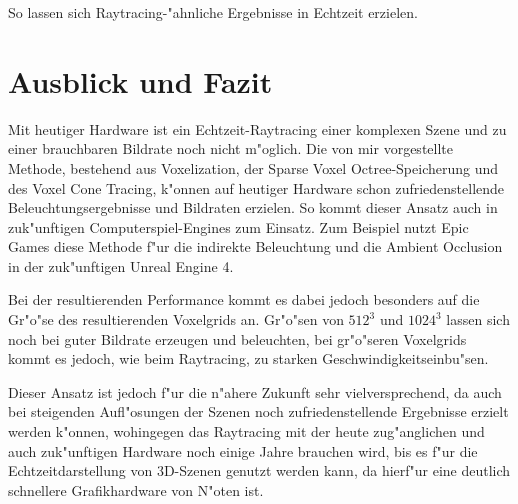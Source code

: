 \documentclass[a4paper, 12pt]{scrartcl}
\begin{document}
So lassen sich Raytracing-"ahnliche Ergebnisse in Echtzeit erzielen.


\section{Ausblick und Fazit}
Mit heutiger Hardware ist ein Echtzeit-Raytracing einer komplexen Szene und zu einer brauchbaren Bildrate noch nicht m"oglich. Die von mir vorgestellte Methode, bestehend aus Voxelization, der Sparse Voxel Octree-Speicherung und des Voxel Cone Tracing, k"onnen auf heutiger Hardware schon zufriedenstellende Beleuchtungsergebnisse und Bildraten erzielen. 
So kommt dieser Ansatz auch in zuk"unftigen Computerspiel-Engines zum Einsatz. Zum Beispiel nutzt Epic Games diese Methode f"ur die indirekte Beleuchtung und die Ambient Occlusion in der zuk"unftigen Unreal Engine 4. 

Bei der resultierenden Performance kommt es dabei jedoch besonders auf die Gr"o"se des resultierenden Voxelgrids an. Gr"o"sen von $512^3$ und $1024^3$ lassen sich noch bei guter Bildrate erzeugen und beleuchten, bei gr"o"seren Voxelgrids kommt es jedoch, wie beim Raytracing, zu starken Geschwindigkeitseinbu"sen.
 
 
Dieser Ansatz ist jedoch f"ur die n"ahere Zukunft sehr vielversprechend, da auch bei steigenden Aufl"osungen der Szenen noch zufriedenstellende Ergebnisse erzielt werden k"onnen, wohingegen das Raytracing mit der heute zug"anglichen und auch zuk"unftigen Hardware noch einige Jahre brauchen wird, bis es f"ur die Echtzeitdarstellung von 3D-Szenen genutzt werden kann, da hierf"ur eine deutlich schnellere Grafikhardware von N"oten ist.
\end{document}

